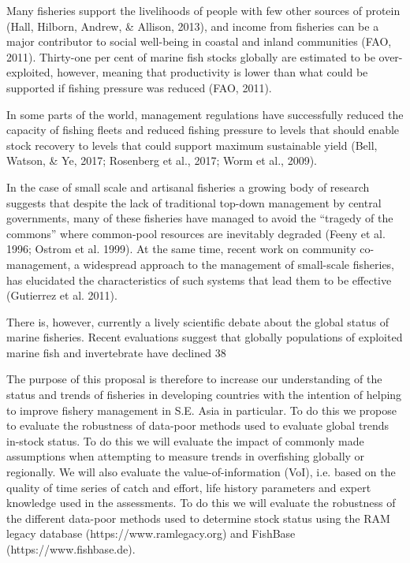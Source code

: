 \iffalse
 Many fisheries support the livelihoods of people with few other sources of protein (Hall, Hilborn, Andrew, \& Allison, 2013), and income from fisheries can be a major contributor to social well-being in coastal and inland communities (FAO, 2011). Thirty-one per cent of marine fish stocks globally are estimated to be over-exploited, however, meaning that productivity is lower than what could be supported if fishing pressure was reduced (FAO, 2011).
 
In some parts of the world, management regulations have successfully reduced the capacity of fishing fleets and reduced fishing pressure to levels that should enable stock recovery to levels that could support maximum sustainable yield (Bell, Watson, \& Ye, 2017; Rosenberg et al., 2017; Worm et al., 2009).

In the case of small scale and artisanal fisheries a growing body of research suggests that despite the lack of traditional top-down management by central governments, many of these fisheries have managed to avoid the “tragedy of the commons” where common-pool resources are inevitably degraded (Feeny et al. 1996; Ostrom et al. 1999). At the same time, recent work on community co-management, a widespread approach to the management of small-scale fisheries, has elucidated the characteristics of such systems that lead them to be effective (Gutierrez et al. 2011).

There is, however, currently a lively scientific debate about the global status of marine fisheries. Recent evaluations suggest that globally populations of exploited marine fish and invertebrate have declined 38%

The purpose of this proposal is therefore to increase our understanding of the status and trends of fisheries in developing countries with the intention of helping to improve fishery management in S.E. Asia in particular. To do this we propose to evaluate the robustness of data-poor methods used to evaluate global trends in-stock status. To do this we will evaluate the impact of commonly made assumptions when attempting to measure trends in overfishing globally or regionally. We will also evaluate the value-of-information (VoI), i.e. based on the quality of time series of catch and effort, life history parameters and expert knowledge used in the assessments. To do this we will evaluate the robustness of the different data-poor methods used to determine stock status using the RAM legacy database (https://www.ramlegacy.org) and FishBase (https://www.fishbase.de).

